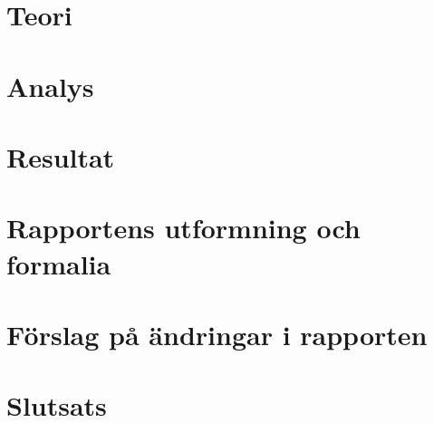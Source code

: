\documentclass[12pt,a4paper,twoside,openright]{report}
\begin{document}
\section*{Teori}

\section*{Analys}

\section*{Resultat}

\section*{Rapportens utformning och formalia}

\section*{Förslag på ändringar i rapporten}

\section*{Slutsats}
\end{document}
